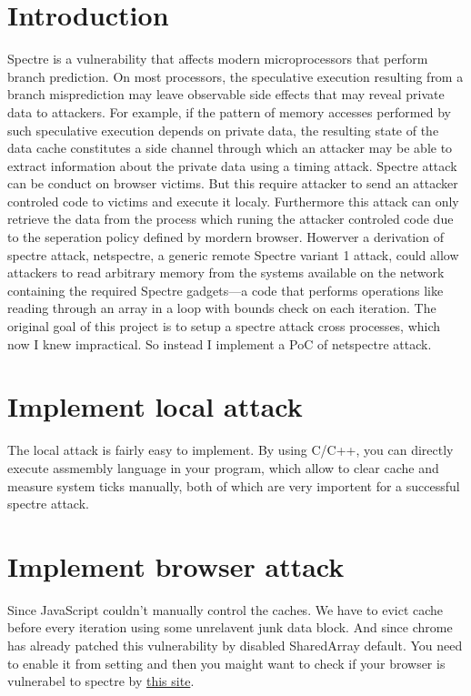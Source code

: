 \documentclass{article}
\begin{document}
\maketitle
\section{Introduction}
Spectre is a vulnerability that affects modern microprocessors that perform branch prediction. On most processors, the speculative execution resulting from a branch misprediction may leave observable side effects that may reveal private data to attackers. For example, if the pattern of memory accesses performed by such speculative execution depends on private data, the resulting state of the data cache constitutes a side channel through which an attacker may be able to extract information about the private data using a timing attack.
\newline
\newline
Spectre attack can be conduct on browser victims. But this require attacker to send an attacker controled code to victims and execute it localy. Furthermore this attack can only retrieve the data from the process which runing the attacker controled code due to the seperation policy defined by mordern browser.
\newline
\newline
Howerver a derivation of spectre attack, netspectre, a generic remote Spectre
variant 1 attack, could allow attackers to read arbitrary memory from the systems available on the network containing the required Spectre gadgets—a code that performs operations like reading through an array in a loop with bounds check on each iteration.
\newline
\newline
The original goal of this project is to setup a spectre attack cross processes, which now I knew impractical. So instead I implement a PoC of netspectre attack.

\section{Implement local attack}
The local attack is fairly easy to implement. By using C/C++, you can directly execute assmembly language in your program, which allow to clear cache and measure system ticks manually, both of which are very importent for a successful spectre attack.
\section{Implement browser attack}
Since JavaScript couldn't manually control the caches. We have to evict cache before every iteration using some unrelavent junk data block. And since chrome has already patched this vulnerability by disabled SharedArray default. You need to enable it from setting and then you maight want to check if your browser is vulnerabel to spectre by \href{https://xlab.tencent.com/special/spectre/spectre_check.html}{this site}.
\end{document}
